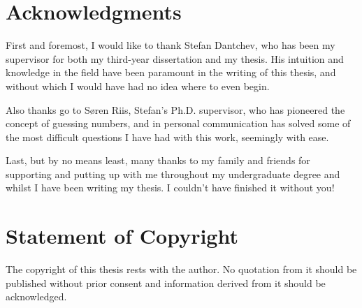 

\chapter*{Acknowledgments}

First and foremost, I would like to thank Stefan Dantchev, who has been my supervisor for both my third-year dissertation and my thesis. His intuition and knowledge in the field have been paramount in the writing of this thesis, and without which I would have had no idea where to even begin.

Also thanks go to S{\o}ren Riis, Stefan's Ph.D. supervisor, who has pioneered the concept of guessing numbers, and in personal communication has solved some of the most difficult questions I have had with this work, seemingly with ease.

Last, but by no means least, many thanks to my family and friends for supporting and putting up with me throughout my undergraduate degree and whilst I have been writing my thesis. I couldn't have finished it without you!

\chapter*{Statement of Copyright}

The copyright of this thesis rests with the author. No quotation from it should be published without prior consent and information derived from it should be acknowledged.